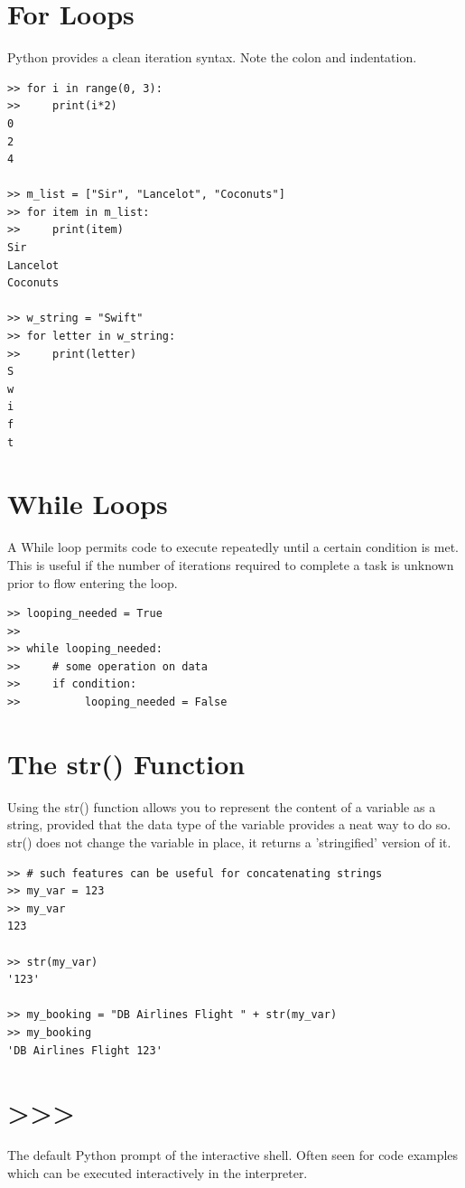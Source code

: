 \documentclass[12pt,a4paper,final,twoside,onecolumn,titlepage]{book}
\begin{document}
\section{For Loops}

Python provides a clean iteration syntax. Note the colon and indentation.

\begin{lstlisting}
>> for i in range(0, 3):
>>     print(i*2)
0
2
4

>> m_list = ["Sir", "Lancelot", "Coconuts"]
>> for item in m_list:
>>     print(item)
Sir
Lancelot
Coconuts

>> w_string = "Swift"
>> for letter in w_string:
>>     print(letter)
S
w
i
f
t
\end{lstlisting}

\section{While Loops}

A While loop permits code to execute repeatedly until a certain condition is met. This is useful if the number of iterations required to complete a task is unknown prior to flow entering the loop.

\begin{lstlisting}
>> looping_needed = True
>>
>> while looping_needed:
>>     # some operation on data
>>     if condition:
>>          looping_needed = False
\end{lstlisting}

\section{The str() Function}

Using the str() function allows you to represent the content of a variable as a string, provided that the data type of the variable provides a neat way to do so. str() does not change the variable in place, it returns a 'stringified' version of it.

\begin{lstlisting}
>> # such features can be useful for concatenating strings
>> my_var = 123
>> my_var
123

>> str(my_var)
'123'

>> my_booking = "DB Airlines Flight " + str(my_var)
>> my_booking
'DB Airlines Flight 123'
\end{lstlisting}

\section{>>>}
The default Python prompt of the interactive shell. Often seen for code examples which can be executed interactively in the interpreter.
\end{document}
